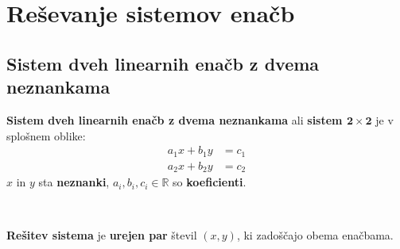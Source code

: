 
    

        \newpage
    
    \section{Reševanje sistemov enačb}

        

            \subsection{Sistem dveh linearnih enačb z dvema neznankama}

                \textbf{Sistem dveh linearnih enačb z dvema neznankama} ali \textbf{sistem $\mathbf{2\times 2}$} je v splošnem oblike:
                    $$\begin{aligned}
                            a_1x+b_1y&=c_1 \\ a_2x+b_2y&=c_2
                        \end{aligned}$$
                $x$ in $y$ sta \textbf{neznanki}, $a_i,b_i,c_i\in\mathbb{R}$ so \textbf{koeficienti}.
            
~
            
                \textbf{Rešitev sistema} je \textbf{urejen par} števil $(x,y)$, ki zadoščajo obema enačbama.
            

